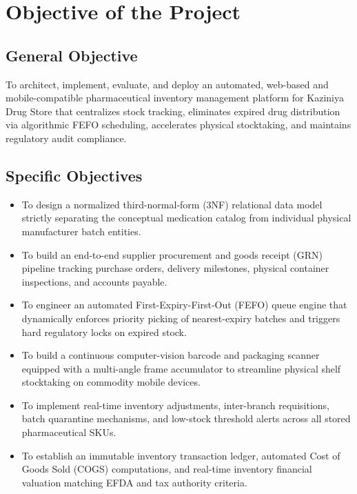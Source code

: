 \section{Objective of the Project}

\subsection{General Objective}
To architect, implement, evaluate, and deploy an automated, web-based and mobile-compatible pharmaceutical inventory management platform for Kaziniya Drug Store that centralizes stock tracking, eliminates expired drug distribution via algorithmic FEFO scheduling, accelerates physical stocktaking, and maintains regulatory audit compliance.

\subsection{Specific Objectives}
\begin{itemize}
    \item To design a normalized third-normal-form (3NF) relational data model strictly separating the conceptual medication catalog from individual physical manufacturer batch entities.
    \item To build an end-to-end supplier procurement and goods receipt (GRN) pipeline tracking purchase orders, delivery milestones, physical container inspections, and accounts payable.
    \item To engineer an automated First-Expiry-First-Out (FEFO) queue engine that dynamically enforces priority picking of nearest-expiry batches and triggers hard regulatory locks on expired stock.
    \item To build a continuous computer-vision barcode and packaging scanner equipped with a multi-angle frame accumulator to streamline physical shelf stocktaking on commodity mobile devices.
    \item To implement real-time inventory adjustments, inter-branch requisitions, batch quarantine mechanisms, and low-stock threshold alerts across all stored pharmaceutical SKUs.
    \item To establish an immutable inventory transaction ledger, automated Cost of Goods Sold (COGS) computations, and real-time inventory financial valuation matching EFDA and tax authority criteria.
\end{itemize}

